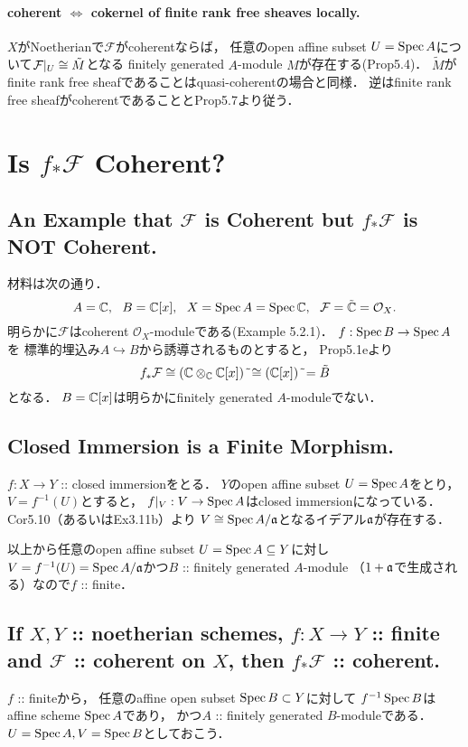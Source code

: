 \documentclass[a4paper]{jsarticle}
\newcommand{\shF}{\mathcal{F}}
\newcommand{\shO}{\mathcal{O}}
\begin{document}
    \paragraph{coherent $\iff$ cokernel of finite rank free sheaves locally.}
    $X$がNoetherianで$\shF$がcoherentならば，
    任意のopen affine subset $U=\operatorname{Spec} A$について$\shF|_U \iso \tilde{M}$となる
    finitely generated $A$-module $M$が存在する(Prop5.4)．
    $\tilde{M}$がfinite rank free sheafであることはquasi-coherentの場合と同様．
    逆はfinite rank free sheafがcoherentであることとProp5.7より従う．

\section{Is $f_* \shF$ Coherent?} %
    \subsection{An Example that $\shF$ is Coherent but $f_*\shF$ is NOT Coherent.}
    材料は次の通り．
    \[ A=\C,~~ B=\C[x],~~ X=\Spec A=\Spec \C,~~ \shF=\tilde{\C}=\shO_X. \]
    明らかに$\shF$はcoherent $\shO_X$-moduleである(Example 5.2.1)．
    $f: \operatorname{Spec} B \to \operatorname{Spec} A$を
    標準的埋込み$A \hookrightarrow B$から誘導されるものとすると，
    Prop5.1eより
    \[ f_* \shF \iso (\C \otimes_{\C} \C[x])~\tilde{} \iso (\C[x])~\tilde{}=\tilde{B} \]
    となる．
    $B=\mathbb{C}[x]$は明らかにfinitely generated $A$-moduleでない．

    \subsection{Closed Immersion is a Finite Morphism.}
    $f: X \to Y$ :: closed immersionをとる．
    $Y$のopen affine subset $U=\operatorname{Spec} A$をとり，
    $V=f^{-1}(U)$とすると，
    $f|_V: V \to \operatorname{Spec} A$はclosed immersionになっている．
    Cor5.10（あるいはEx3.11b）より
    $V \cong \operatorname{Spec} A/\mathfrak{a}$となるイデアル$\mathfrak{a}$が存在する．

    以上から任意のopen affine subset $U=\operatorname{Spec} A \subseteq Y$に対し
    $V=f^{-1}(U)=\operatorname{Spec} A/\mathfrak{a}$かつ$B$ :: finitely generated $A$-module
    （$1+\mathfrak{a}$で生成される）なので$f$ :: finite．

    \subsection{If $X,Y$ :: noetherian schemes, $f: X \to Y$ :: finite and $\shF$ :: coherent on $X$, then $f_*\shF$ :: coherent.}
    $f$ :: finiteから，
    任意のaffine open subset $\operatorname{Spec} B \subset Y$に対して
    $f^{-1}\operatorname{Spec} B$はaffine scheme $\operatorname{Spec} A$であり，
    かつ$A$ :: finitely generated $B$-moduleである．
    $U=\operatorname{Spec} A, V=\operatorname{Spec} B$としておこう．
\end{document}
